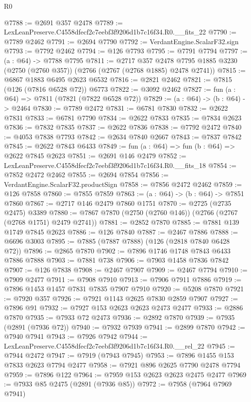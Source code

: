 \begin{lexlean}{R0}
\begin{coremodule}
@7788 := @2691 @357 @2478
@7789 := LexLeanPreserve.C4558dfecf2c7eebf3f9206d1b7c16f34.R0.__fits_22
@7790 := @7789 @2462
@7791 := @2694 @7790
@7792 := VerdantEngine.ScalarF32.sign
@7793 := @7792 @2462
@7794 := @126 @7793
@7795 := @7791 @7794
@7797 := (a : @64) -> @7788 @7795
@7811 := @2717
    @357
    @2478
    @7795
    @1885
    @3230
    (@2750 (@2760 @357))
    (@2766 (@2767 (@2768 @1885) @2478 @2741))
@7815 := @6867 @1883 @6495 @2623 @6532
@7816 := @2821 @2462
@7821 := @7815 (@126 (@7816 @6528 @72)) @6773
@7822 := @3092 @2462
@7827 := fun (a : @64) => @7811 (@7821 (@7822 @6528 @72))
@7829 := (a : @64) -> (b : @64) -> @2464
@7830 := @7789 @2472
@7831 := @6781 @7830
@7832 := @2622 @7831
@7833 := @6781 @7790
@7834 := @2622 @7833
@7835 := @7834 @2623
@7836 := @7832 @7835
@7837 := @2622 @7836
@7838 := @7792 @2472
@7840 := @4053 @7838 @7793
@7842 := @2634 @7840 @2667
@7843 := @7837 @7842
@7845 := @2622 @7843 @6433
@7849 := fun (a : @64) => fun (b : @64) => @2622 @7845 @2623
@7851 := @2691 @146 @2479
@7852 := LexLeanPreserve.C4558dfecf2c7eebf3f9206d1b7c16f34.R0.__fits_18
@7854 := @7852 @2472 @2462
@7855 := @2694 @7854
@7856 := VerdantEngine.ScalarF32.productSign
@7858 := @7856 @2472 @2462
@7859 := @126 @7858
@7860 := @7855 @7859
@7863 := (a : @64) -> (b : @64) -> @7851 @7860
@7867 := @2717 @146 @2479 @7860 @1751
@7870 := @2725 (@2735 @2475) @3389
@7880 := @7867 @7870 (@2750 (@2760 @146)) (@2766 (@2767 (@2768 @1751) @2479 @2741))
@7881 := @2852 @7870
@7885 := @7881 @139 @1749 @7845 @2623
@7886 := @126 @7840
@7887 := @2467 @7886
@7888 := @6696 @3003
@7895 := @7885 (@7887 @7888) (@126 (@2818 @7840 @6428 @72))
@7896 := @2865 @7870
@7902 := @7896 @1746 @1748 @7843 @6433 @7886 @7888
@7903 := @7881 @738
@7906 := @7903 @1458 @7836 @7842
@7907 := @126 @7838
@7908 := @2467 @7907
@7909 := @2467 @7794
@7910 := @7909 @2477
@7911 := @7908 @7910
@7913 := @7906 @7911 @7886
@7919 := @7896 @1453 @1457 @7831 @7835 @7907 @7910
@7920 := @5208 @7870
@7921 := @7920 @357
@7926 := @7921 @1143 @2625 @7830 @2859 @7907
@7927 := @7896 @91
@7932 := @7927 @153 @2623 @2623 @2473 @2477
@7933 := @2886 @7870
@7935 := @7933 @72 @2473
@7936 := @2892 @7870
@7939 := @7935 (@2891 (@7936 @72))
@7940 := @7932 @7939
@7941 := @2899 @7870
@7942 := @7940 @7941
@7943 := @7926 @7942
@7944 := LexLeanPreserve.C4558dfecf2c7eebf3f9206d1b7c16f34.R0.__rel_22
@7945 := @7944 @2472
@7947 := @7919 (@7943 @7945)
@7953 := @7896 @1455 @153 @7833 @2623 @7794 @2477
@7958 := @7921 @896 @2625 @7790 @2478 @7794
@7959 := @7896 @122
@7964 := @7959 @153 @2623 @2623 @2475 @2477
@7969 := @7933 @85 @2475 (@2891 (@7936 @85))
@7972 := @7958 (@7964 @7969 @7941)

\end{coremodule}
\end{lexlean}
